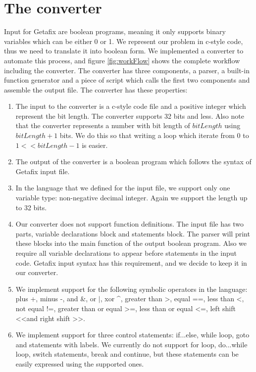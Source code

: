 \section{The converter}
Input for Getafix are boolean programs, meaning it only supports binary variables which can be either 0 or 1. We represent our problem in c-style code, thus we need to translate it into boolean form. We implemented a converter to automate this process, and figure \ref{fig:workFlow} shows the complete workflow including the converter. The converter has three components, a parser, a built-in function generator and a piece of script which calls the first two components and assemble the output file. The converter has these properties:
\begin{enumerate}
\item The input to the converter is a c-style code file and a positive integer which represent the bit length. The converter supports 32 bits and less. Also note that the converter represents a number with bit length of $bitLength$ using $bitLength + 1$ bits. We do this so that writing a loop which iterate from $0$ to $1<<bitLength - 1$ is easier.
\item The output of the converter is a boolean program which follows the syntax of Getafix input file.
\item In the language that we defined for the input file, we support only one variable type: non-negative decimal integer. Again we support the length up to 32 bits.
\item Our converter does not support function definitions. The input file has two parts, variable declarations block and statements block. The parser will print these blocks into the main function of the output boolean program. Also we require all variable declarations to appear before statements in the input code. Getafix input syntax has this requirement, and we decide to keep it in our converter.
\item We implement support for the following symbolic operators in the language: plus +, minus -, and \&, or $|$, xor \textasciicircum , greater than \textgreater, equal ==, less than \textless, not equal !=, greater than or equal \textgreater=, less than or equal \textless=, left shift \textless\textless and right shift \textgreater\textgreater.
\item We implement support for three control statements: if...else, while loop, goto and statements with labels. We currently do not support for loop, do...while loop, switch statements, break and continue, but these statements can be easily expressed using the supported ones.
\end{enumerate}

